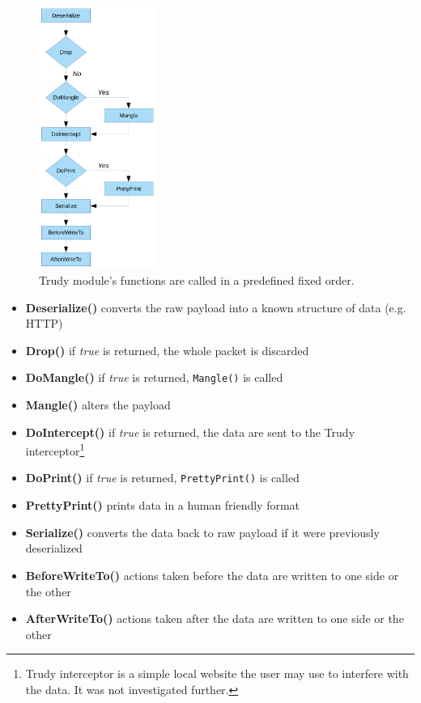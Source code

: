 \documentclass[thesis=M,english]{FITthesis}[2012/10/20]
\begin{document}
\begin{figure}
	\centering
	\includegraphics[width=0.34\textwidth]{trudy-flow.pdf}
	\caption[Trudy's data flow]{Trudy module's functions are called in a predefined fixed order.}
	\label{img:analysis-trudy-flow}
\end{figure}

\begin{itemize}
	\item \textbf{Deserialize()} converts the raw payload into a known structure of data (e.g. HTTP)
	\item \textbf{Drop()} if \emph{true} is returned, the whole packet is discarded
	\item \textbf{DoMangle()} if \emph{true} is returned, \texttt{Mangle()} is called
	\item \textbf{Mangle()} alters the payload
	\item \textbf{DoIntercept()} if \emph{true} is returned, the data are sent to the Trudy interceptor\footnote{Trudy interceptor is a simple local website the user may use to interfere with the data. It was not investigated further.}
	\item \textbf{DoPrint()} if \emph{true} is returned, \texttt{PrettyPrint()} is called
	\item \textbf{PrettyPrint()} prints data in a human friendly format
	\item \textbf{Serialize()} converts the data back to raw payload if it were previously deserialized
	\item \textbf{BeforeWriteTo()} actions taken before the data are written to one side or the other
	\item \textbf{AfterWriteTo()} actions taken after the data are written to one side or the other

\end{itemize}
\end{document}
